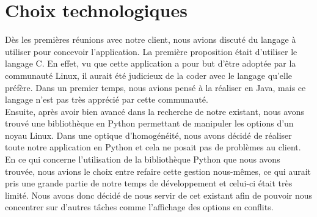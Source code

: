 \documentclass[17pts]{report}
\begin{document}
\section{Choix technologiques}
\label{sec:Choix technologiques}
Dès les premières réunions avec notre client, nous avions discuté du langage à
utiliser pour concevoir l'application. La première proposition était d'utiliser
le langage C. En effet, vu que cette application a pour but d'être adoptée par
la communauté Linux, il aurait été judicieux de la coder avec le langage
qu'elle préfère. Dans un premier temps, nous avions pensé à la réaliser en
Java, mais ce langage n'est pas très apprécié par cette communauté.  \\

Ensuite, après avoir bien avancé dans la recherche de notre existant, nous
avons trouvé une bibliothèque en Python permettant de manipuler les options
d'un noyau Linux. Dans une optique d'homogénéité, nous avons décidé de réaliser
toute notre application en Python et cela ne posait pas de problèmes au client.
\\

En ce qui concerne l'utilisation de la bibliothèque Python que nous avons
trouvée, nous avions le choix entre refaire cette gestion nous-mêmes, ce qui
aurait pris une grande partie de notre temps de développement et celui-ci était
très limité. Nous avons donc décidé de nous servir de cet existant afin de
pouvoir nous concentrer sur d'autres tâches comme l'affichage des options en
conflits.
\end{document}
